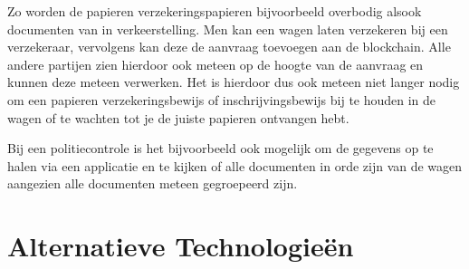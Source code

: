 Zo worden de papieren verzekeringspapieren bijvoorbeeld overbodig alsook documenten van in verkeerstelling. Men kan een wagen laten verzekeren bij een verzekeraar, vervolgens kan deze de aanvraag toevoegen aan de blockchain. Alle andere partijen zien hierdoor ook meteen op de hoogte van de aanvraag en kunnen deze meteen verwerken. Het is hierdoor dus ook meteen niet langer nodig om een papieren verzekeringsbewijs of inschrijvingsbewijs bij te houden in de wagen of te wachten tot je de juiste papieren ontvangen hebt.

Bij een politiecontrole is het bijvoorbeeld ook mogelijk om de gegevens op te halen via een applicatie en te kijken of alle documenten in orde zijn van de wagen aangezien alle documenten meteen gegroepeerd zijn. 

\chapter{Alternatieve Technologieën}
\label{ch:alternative-technology}


